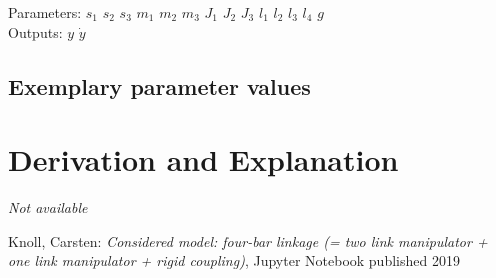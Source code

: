 \documentclass[10pt,a4paper]{article}
\begin{document}
	\noindent
	Parameters: $s_1$ $s_2$ $s_3$ $m_1$ $m_2$ $m_3$ $J_1$ $J_2$ $J_3$ $l_1$ $l_2$ $l_3$ $l_4$ $g$%
	\\
	Outputs: $y$ $\dot{y}$ %
	
	
	
	
	\subsection{Exemplary parameter values}
	

	
	\section{Derivation and Explanation} %
	
	\textit{Not available}
	
	
	\begin{thebibliography}{10}		
		Knoll, Carsten: 
		\textit{Considered model: four-bar linkage (= two link manipulator + one link manipulator + rigid coupling)}, Jupyter Notebook published 2019
	\end{thebibliography}
\end{document}
